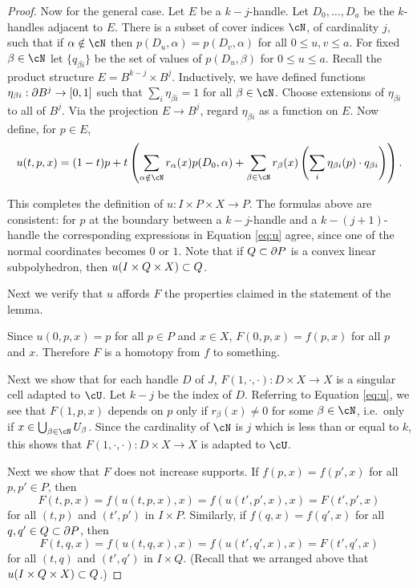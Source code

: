 \begin{proof}
Now for the general case.
Let $E$ be a $k{-}j$-handle.
Let $D_0,\ldots,D_a$ be the $k$-handles adjacent to $E$.
There is a subset of cover indices $\cN$, of cardinality $j$, 
such that if $\alpha\notin\cN$ then
$p(D_u, \alpha) = p(D_v, \alpha)$ for all $0\le u,v \le a$.
For fixed $\beta\in\cN$ let $\{q_{\beta i}\}$ be the set of values of 
$p(D_u, \beta)$ for $0\le u \le a$.
Recall the product structure $E = B^{k-j}\times B^j$.
Inductively, we have defined functions $\eta_{\beta i}:\partial B^j \to [0,1]$ such that
$\sum_i \eta_{\beta i} = 1$ for all $\beta\in \cN$.
Choose extensions of $\eta_{\beta i}$ to all of $B^j$.
Via the projection $E\to B^j$, regard $\eta_{\beta i}$ as a function on $E$.
Now define, for $p \in E$,
\begin{equation}
\label{eq:u}
    u(t, p, x) = (1-t)p + t \left(
            \sum_{\alpha \notin \cN} r_\alpha(x) p(D_0, \alpha)
                + \sum_{\beta \in \cN} r_\beta(x) \left( \sum_i \eta_{\beta i}(p) \cdot q_{\beta i} \right)
             \right) .
\end{equation}

This completes the definition of $u: I \times P \times X \to P$. 
The formulas above are consistent: for $p$ at the boundary between a $k-j$-handle and 
a $k-(j+1)$-handle the corresponding expressions in Equation \eqref{eq:u} agree, 
since one of the normal coordinates becomes $0$ or $1$. 
Note that if $Q\subset \partial P$ is a convex linear subpolyhedron, then $u(I\times Q\times X) \subset Q$.

\medskip

Next we verify that $u$ affords $F$ the properties claimed in the statement of the lemma.

Since $u(0, p, x) = p$ for all $p\in P$ and $x\in X$, $F(0, p, x) = f(p, x)$ for all $p$ and $x$.
Therefore $F$ is a homotopy from $f$ to something.


\medskip

Next we show that for each handle $D$ of $J$, $F(1, \cdot, \cdot) : D\times X \to X$
is a singular cell adapted to $\cU$.
Let $k-j$ be the index of $D$.
Referring to Equation \eqref{eq:u}, we see that $F(1, p, x)$ depends on $p$ only if 
$r_\beta(x) \ne 0$ for some $\beta\in\cN$, i.e.\ only if
$x\in \bigcup_{\beta\in\cN} U_\beta$.
Since the cardinality of $\cN$ is $j$ which is less than or equal to $k$,
this shows that $F(1, \cdot, \cdot) : D\times X \to X$ is adapted to $\cU$.

\medskip

Next we show that $F$ does not increase supports.
If $f(p,x) = f(p',x)$ for all $p,p'\in P$,
then 
\[
	F(t, p, x) = f(u(t,p,x),x) = f(u(t',p',x),x) = F(t',p',x)
\]
for all $(t,p)$ and $(t',p')$ in $I\times P$.
Similarly, if $f(q,x) = f(q',x)$ for all $q,q'\in Q\subset \partial P$,
then 
\[
	F(t, q, x) = f(u(t,q,x),x) = f(u(t',q',x),x) = F(t',q',x)
\]
for all $(t,q)$ and $(t',q')$ in $I\times Q$.
(Recall that we arranged above that $u(I\times Q\times X) \subset Q$.)


\end{proof}
